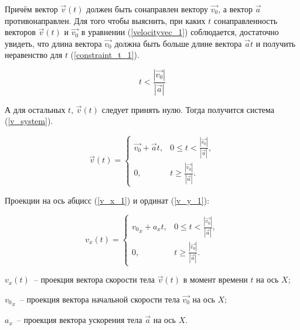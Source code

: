 Причём вектор \(\vec{v}(t)\) должен быть сонаправлен вектору \(\vec{v_0}\), а вектор \(\vec{a}\) противонаправлен.
Для того чтобы выяснить, при каких \(t\) сонаправленность векторов \(\vec{v}(t)\) и \(\vec{v_0}\) в уравнении (\ref{velocityvec_1}) соблюдается,
достаточно увидеть, что длина вектора \(\vec{v_0}\) должна быть больше длине вектора \(\vec{a}t\)
и получить неравенство для \(t\) (\ref{constraint_t_1}).


\newcommand\Constrainttle{
  t < \frac{\left|\vec{v_0}\right|}{\left|\vec{a}\right|}
}

\newcommand\Constrainttge{
  t \geqslant \frac{\left|\vec{v_0}\right|}{\left|\vec{a}\right|}
}

\begin{equation}\label{constraint_t_1}
  \Constrainttle
\end{equation}

А для остальных \(t\), \(\vec{v}(t)\) следует принять нулю. Тогда получится система (\ref{v_system}).

\begin{equation}\label{v_system}
  \vec{v}(t) =
  \begin{cases}
    \vec{v_0} + \vec{a}t, & 0 \leqslant \Constrainttle, \\
    0,                    & \Constrainttge .
  \end{cases}
\end{equation}

Проекции на ось абцисс (\ref{v_x_1}) и ординат (\ref{v_y_1}):

\begin{equation}\label{v_x_1}
  v_x(t) =
  \begin{cases}
    {v_0}_x + a_x t, & 0 \leqslant \Constrainttle, \\
    0,               & \Constrainttge.
  \end{cases}
\end{equation}

\begin{Underequation}
  \(v_x(t)\)~-- проекция вектора скорости тела \(\vec{v}(t)\) в момент времени \(t\) на ось \(X\);

  \({v_0}_x\)~-- проекция вектора начальной скорости тела \(\vec{v_0}\) на ось \(X\);

  \(a_x\)~-- проекция вектора ускорения тела \(\vec{a}\) на ось \(X\).
\end{Underequation}

